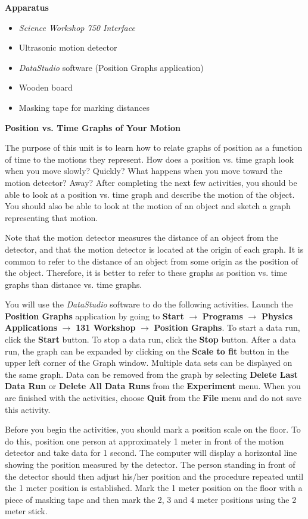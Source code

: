 \textbf{Apparatus} 

\begin{itemize}
\item \textit{Science Workshop 750 Interface}
\item Ultrasonic motion detector 
\item \textit{DataStudio} software (Position Graphs application)
\item Wooden board
\item Masking tape for marking distances
\end{itemize}
\textbf{Position vs. Time Graphs of Your Motion }

The purpose of this unit is to learn how to relate graphs of position as a function
of time to the motions they represent. How does a position vs. time graph look
when you move slowly? Quickly? What happens when you move toward the motion
detector? Away? After completing the next few activities, you should be able
to look at a position vs. time graph and describe the motion of the object.
You should also be able to look at the motion of an object and sketch a graph
representing that motion.

Note that the motion detector measures the distance of an object from the detector,
and that the motion detector is located at the origin of each graph. It is common
to refer to the distance of an object from some origin as the position of the
object. Therefore, it is better to refer to these graphs as position vs. time
graphs than distance vs. time graphs.

You will use the \textit{DataStudio} software to do the following activities.
Launch the \textbf{Position
Graphs} application by going to \textbf{Start} $\rightarrow$ \textbf{Programs} $\rightarrow$ \textbf{Physics Applications} $\rightarrow$ \textbf{131 Workshop} $\rightarrow$ \textbf{Position Graphs}. To start a data run, click the \textbf{Start} button. To stop a data run,
click the \textbf{Stop} button. After a data run, the graph can be expanded
by clicking on the \textbf{Scale to fit} button in the upper left corner of
the Graph window. Multiple data sets can be displayed on the same graph. Data
can be removed from the graph by selecting \textbf{Delete Last Data Run} or
\textbf{Delete All Data Runs} from the \textbf{Experiment} menu. When you are
finished with the activities, choose \textbf{Quit} from the \textbf{File} menu
and do not save this activity.

Before you begin the activities, you should mark a position scale on the floor.
To do this, position one person at approximately 1 meter in front of the motion
detector and take data for 1 second. The computer will display a horizontal
line showing the position measured by the detector. The person standing in front
of the detector should then adjust his/her position and the procedure repeated
until the 1 meter position is established. Mark the 1 meter position on the
floor with a piece of masking tape and then mark the 2, 3 and 4 meter positions
using the 2 meter stick.


